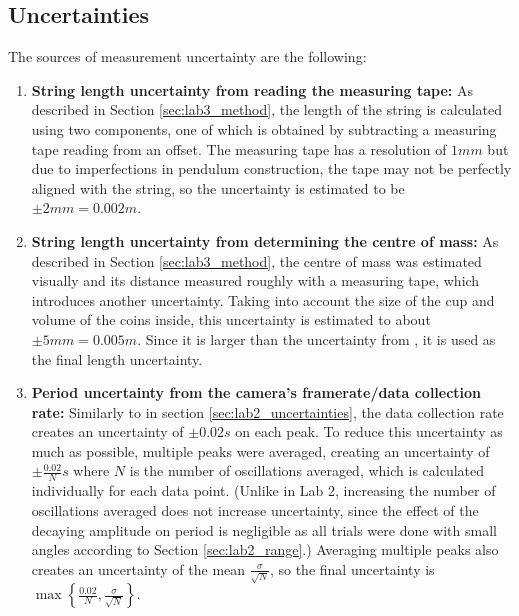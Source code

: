 \documentclass[aps,twocolumn,secnumarabic,nobalancelastpage,amsmath,amssymb,nofootinbib,floatfix,letterpaper]{revtex4}
\begin{document}
\subsection{Uncertainties}
\label{sec:lab3a_uncertainties}

The sources of measurement uncertainty are the following:
\begin{enumerate}
    \item
        \textbf{String length uncertainty from reading the measuring tape:} As described in Section \ref{sec:lab3_method},
        the length of the string is calculated using two components, one of which is obtained by subtracting a measuring
        tape reading from an offset. The measuring tape has a resolution of \(1\si{mm}\) but due to imperfections in
        pendulum construction, the tape may not be perfectly aligned with the string, so the uncertainty is estimated to be
        \(\pm 2\si{mm} = 0.002\si{m}\).
    \item
        \textbf{String length uncertainty from determining the centre of mass:} As described in Section
        \ref{sec:lab3_method}, the centre of mass was estimated visually and its distance measured roughly with a
        measuring tape, which introduces another uncertainty. Taking into account the size of the cup and volume of the
        coins inside, this uncertainty is estimated to about \(\pm 5\si{mm} = 0.005\si{m}\). Since it is larger than the
        uncertainty from , it is used as the final length uncertainty.
    \item
        \textbf{Period uncertainty from the camera's framerate/data collection rate:} Similarly to  in
        section \ref{sec:lab2_uncertainties}, the data collection rate creates an uncertainty of \(\pm 0.02\si{s}\) on
        each peak. To reduce this uncertainty as much as possible, multiple peaks were averaged, creating an uncertainty
        of \(\pm \frac{0.02}{N}\si{s}\) where \(N\) is the number of oscillations averaged, which is calculated
        individually for each data point. (Unlike in Lab 2, increasing the number of oscillations averaged does not
        increase uncertainty, since the effect of the decaying amplitude on period is negligible as all trials were done
        with small angles according to Section \ref{sec:lab2_range}.) Averaging multiple peaks also creates an
        uncertainty of the mean \(\frac{\sigma}{\sqrt{N}}\), so the final uncertainty is
        \(\max\left\{\frac{0.02}{N}, \frac{\sigma}{\sqrt{N}}\right\}\).
\end{enumerate}
\end{document}
